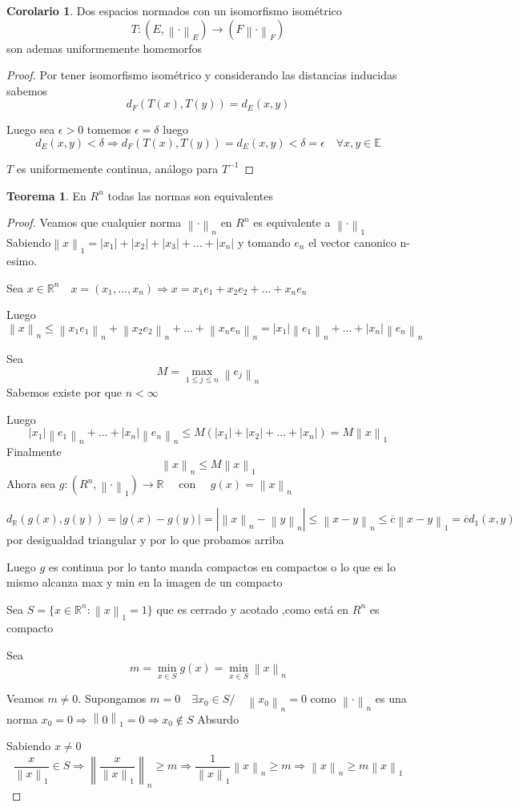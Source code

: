 \documentclass[12pt]{article}
\newcommand{\R}{\mathbb{R}}
\newcommand{\E}{\mathbb{E}}
\newcommand{\Ra}{\Rightarrow}
\newcommand{\ra}{\rightarrow}
\newcommand{\ol}{\overline}
\newcommand{\norm}[1]{\left\lVert#1\right\rVert}
\theoremstyle{definition}
\newtheorem{theorem}{Teorema}
\newtheorem{corollary}{Corolario}[theorem]
\begin{document}
\begin{corollary}
  Dos espacios normados con un isomorfismo isométrico $$T:(E,\norm{\cdot}_{E}) \ra (F \norm{\cdot}_{F})$$son ademas uniformemente homemorfos

	\begin{proof}
	  Por tener isomorfismo isométrico y considerando las distancias inducidas sabemos 
	$$  d_{F}(T(x),T(y)) = d_{E}(x,y)$$

	Luego sea $\epsilon > 0 $ tomemos $\epsilon = \delta$ luego
	$$ d_{E}(x,y) < \delta \Ra d_{F}(T(x),T(y)) = d_{E}(x,y) < \delta = \epsilon \quad \forall x,y \in \E$$

	$T$ es uniformemente continua, análogo para $T^{-1}$
	\end{proof}
\end{corollary}
\begin{theorem}
  En $R^{n}$ todas las normas son equivalentes

\begin{proof}
  Veamos que cualquier norma $\norm{\cdot}_{n}$ en $R^n$ es equivalente a $\norm{\cdot}_{1}$ Sabiendo$ \norm{x}_{1} = |x_{1}|+|x_{2}|+|x_{3}|+\dots +|x_{n}| $ y tomando $e_{n}$ el vector canonico n-esimo. 
 
 \noindent Sea $x \in \R^n \quad x=(x_{1},\dots,x_{n}) \Ra x = x_{1}e_{1}+x_{2}e_{2}+\dots+x_{n}e_{n}$

  \noindent Luego $$ \norm{x}_{n} \leq \norm{x_{1}e_{1}}_{n} + \norm{x_{2}e_{2}}_{n} + \dots + \norm{x_{n}e_{n}}_{n} = |x_{1}| \norm{e_{1}}_{n}+ \dots + |x_{n}| \norm{e_{n}}_{n}$$

  Sea $$M =\max_{1 \leq j \leq n}{\norm{e_{j}}_{n}} $$
Sabemos existe por que $n < \infty$
  
 \noindent Luego $$  |x_{1}| \norm{e_{1}}_{n}+ \dots + |x_{n}| \norm{e_{n}}_{n} \leq M(|x_{1}| + |x_{2}| +\dots + |x_{n}|) = M \norm{x}_{1}$$
   Finalmente $$ \norm{x}_{n} \leq M \norm{x}_{1}$$
  Ahora sea $g:(R^n, \norm{\cdot}_{1}) \ra \R \quad$ con $\quad g(x) = \norm{x}_{n}$

  $$ d_{\R}(g(x),g(y)) = | g(x) - g(y) | = |\norm{x}_{n} - \norm{y}_{n}| \leq \norm{x-y}_{n} \leq \ol c \norm{x-y}_{1} = \ol c d_{1}(x,y)$$
por desigualdad triangular y por lo que probamos arriba

Luego $g$ es continua por lo tanto manda compactos en compactos o lo que es lo mismo alcanza max y min en la imagen de un compacto

Sea $S = \{x \in \R^{n}: \norm{x}_{1}=1\}$ que es cerrado y acotado ,como está en $R^n$ es compacto

Sea $$m = \min_{x \in S}{g(x)} = \min_{x \in S}{\norm{x}_{n}}$$

Veamos $m \neq 0$. Supongamos $m = 0 \quad \exists x_{0} \in S / \quad \norm{x_{0}}_{n} = 0$ como $\norm{\cdot}_{n}$ es una norma $x_{0} = 0 \Ra \norm{0}_{1} = 0 \Ra x_{0} \notin S$ Absurdo

Sabiendo $x \neq 0$
$$\frac{x}{\norm{x}_{1}} \in S \Ra \norm{\frac{x}{\norm{x}_{1}}}_{n} \geq m \Ra \frac{1}{\norm{x}_{1}} \norm{x}_{n} \geq m \Ra \norm{x}_{n} \geq m\norm{x}_{1}$$
\end{proof}


\end{theorem}
\end{document}
